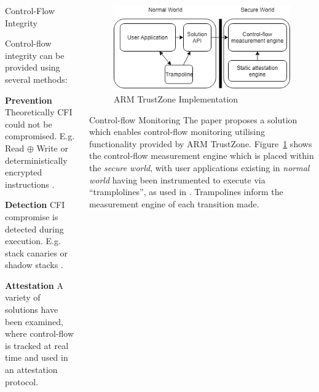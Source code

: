 \documentclass[final]{beamer}
\newlength{\onecolwid}
\newlength{\twocolwid}
\begin{document}
\begin{frame}[t]
\begin{columns}[t]
\begin{column}{\twocolwid}
\begin{columns}[t,totalwidth=\twocolwid]
\begin{column}{\onecolwid}
\begin{block}{Control-Flow Integrity}

Control-flow integrity can be provided using several methods:


\textbf{Prevention} Theoretically CFI could not be compromised. E.g. Read $\oplus$ Write or deterministically encrypted instructions \cite{Lee2019}.

\textbf{Detection} CFI compromise is detected during execution. E.g. stack canaries or shadow stacks \cite{Christoulakis2016}.

\textbf{Attestation} A variety of solutions have been examined, where control-flow is tracked at real time and used in an attestation protocol.
\end{block}

\end{column} %


\begin{column}{\onecolwid}\vspace{-.6in} %

\begin{figure}
\includegraphics[width=\linewidth]{images/GraphicalRepresentation.png}
\caption{ARM TrustZone Implementation}
\label{fig:representation}
\vspace{-1cm}
\end{figure}

\begin{block}{Control-flow Monitoring}
The paper proposes a solution which enables control-flow monitoring utilising functionality provided by ARM TrustZone. Figure~\ref{fig:representation} shows the control-flow measurement engine which is placed within the \textit{secure world}, with user applications existing in \textit{normal world} having been instrumented to execute via ``tramplolines'', as used in \cite{Abera2016}. Trampolines inform the measurement engine of each transition made.


\end{block}
\end{column}
\end{columns}
\end{column}
\end{columns}
\end{frame}
\end{document}
